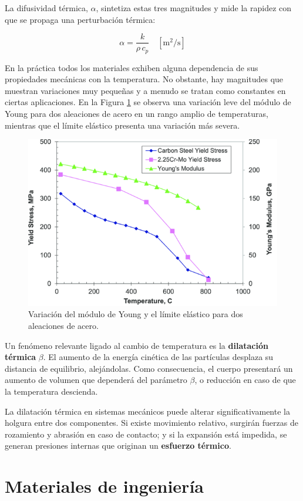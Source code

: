 La difusividad térmica, \(\alpha\), sintetiza estas tres magnitudes y mide la rapidez con que se propaga una perturbación térmica:

\begin{equation}
  \alpha = \frac{k}{\rho\,c_p}
  \quad [\mathrm{m^2/s}]
\end{equation}

En la práctica todos los materiales exhiben alguna dependencia de sus propiedades mecánicas con la temperatura. No obstante, hay magnitudes que muestran variaciones muy pequeñas y a menudo se tratan como constantes en ciertas aplicaciones. En la Figura \ref{fig:ttt} se observa una variación leve del módulo de Young para dos aleaciones de acero en un rango amplio de temperaturas, mientras que el límite elástico presenta una variación más severa.

\begin{figure}[h!]
    \centering
    \includegraphics[width=0.7\linewidth]{imgs/tempgraf.png}
    \caption{Variación del módulo de Young y el límite elástico para dos aleaciones de acero.}
    \label{fig:ttt}
\end{figure}

Un fenómeno relevante ligado al cambio de temperatura es la \textbf{dilatación térmica} $\beta$. El aumento de la energía cinética de las partículas desplaza su distancia de equilibrio, alejándolas. Como consecuencia, el cuerpo presentará un aumento de volumen que dependerá del parámetro $\beta$, o reducción en caso de que la temperatura descienda.

La dilatación térmica en sistemas mecánicos puede alterar significativamente la holgura entre dos componentes. Si existe movimiento relativo, surgirán fuerzas de rozamiento y abrasión en caso de contacto; y si la expansión está impedida, se generan presiones internas que originan un \textbf{esfuerzo térmico}.

\section{Materiales de ingeniería}

